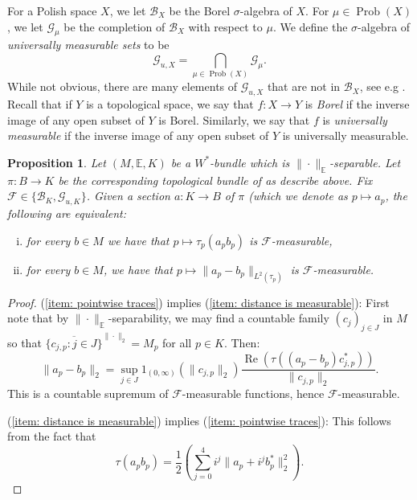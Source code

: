 \documentclass[10pt]{amsart}
\newtheorem{prop}[thm]{Proposition}
\theoremstyle{definition}
\numberwithin{equation}{section}
\newcommand{\bE}{{\mathbb E}}
\newcommand{\cB}{{\mathcal B}}
\newcommand{\cF}{{\mathcal F}}
\newcommand{\cG}{{\mathcal G}}
\renewcommand{\Re}{\operatorname{Re}}
\DeclareMathOperator{\Prob}{Prob}
\begin{document}
For a Polish space $X$, we let $\cB_{X}$ be the Borel $\sigma$-algebra of $X$. For $\mu\in \Prob(X)$, we let $\cG_{\mu}$ be the completion of $\cB_{X}$ with respect to $\mu$. We define the $\sigma$-algebra of \emph{universally measurable sets} to be 
\[\cG_{u,X}=\bigcap_{\mu\in \Prob(X)}\cG_{\mu}.\]
While not obvious, there are many elements of $\cG_{u,X}$ that are not in $\cB_{X}$, see e.g \cite[Theorems 14.2 and 21.10]{KechrisClassic}.
Recall that if $Y$ is a topological space, we say that $f\colon X\to Y$ is \emph{Borel} if the inverse image of any open subset of $Y$ is Borel. Similarly, we say that $f$ is \emph{universally measurable} if the inverse image of any open subset of $Y$ is universally measurable.
\begin{prop}\label{prop:Borel TFAE}
 Let $(M,\bE,K)$ be a $W^{*}$-bundle which is $\|\cdot\|_{\bE}$-separable. Let $\pi\colon B\to K$ be the corresponding topological bundle of \cite{EPBundles} as describe above. Fix $\cF\in \{\cB_{K},\cG_{u,K}\}$. Given a section $a\colon K\to B$ of $\pi$ (which we denote as $p\mapsto a_{p}$, the following are equivalent:
 \begin{enumerate}[(i)]
 \item for every $b\in M$ we have that $p\mapsto \tau_{p}(a_{p}b_{p})$ is $\cF$-measurable, \label{item: pointwise traces}
 \item for every $b\in M$, we have that $p\mapsto \|a_{p}-b_{p}\|_{L^{2}(\tau_{p})}$ is $\cF$-measurable. \label{item: distance is measurable}

 \end{enumerate}
\end{prop}


\begin{proof}
(\ref{item: pointwise traces}) implies (\ref{item: distance is measurable}):
First note that by $\|\cdot\|_{\bE}$-separability, we may find a countable family $(c_{j})_{j\in J}$ in $M$ so that $\overline{\{c_{j,p}:j\in J\}}^{\|\cdot\|_{2}}=M_{p}$ for all $p\in K$. 
Then:
 \[\|a_{p}-b_{p}\|_{2}=\sup_{j\in J}1_{(0,\infty)}(\|c_{j,p}\|_{2})\frac{\Re(\tau((a_{p}-b_{p})c_{j,p}^{*}))}{\|c_{j,p}\|_{2}}.\]
 This is a countable supremum of $\cF$-measurable functions, hence $\cF$-measurable.
 
 (\ref{item: distance is measurable}) implies (\ref{item: pointwise traces}): This follows from the fact that
 \[\tau(a_{p}b_{p})=\frac{1}{2}\left(\sum_{j=0}^{4}i^{j}\|a_{p}+i^{j}b_{p}^{*}\|_{2}^{2}\right).\]



\end{proof}
\end{document}
